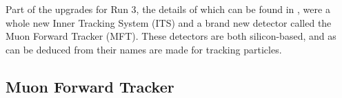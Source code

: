Part of the upgrades for Run 3, the details of which can be found in \cite{ALICE_Upgrade_LOI}, were a whole new Inner Tracking System (ITS) and a brand new detector called the Muon Forward Tracker (MFT). These detectors are both silicon-based, and as can be deduced from their names are made for tracking particles. 


\subsection{Muon Forward Tracker}